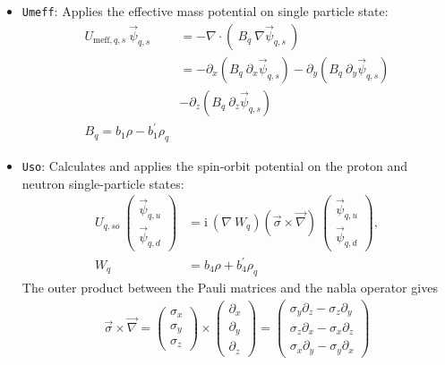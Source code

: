 \documentclass[3p]{elsarticle}
\begin{document}
\begin{itemize}
\item \texttt{Umeff}: Applies the effective mass potential on single particle state: 
\begin{align}
U_{\mathrm{meff},q,s}   \: \vec{\psi}_{q,s}  & = - \nabla \cdot \left( \: B_q \: \nabla \vec{\psi}_{q,s} \: \right) \\
& = - \partial_x \left( B_q \: \partial_x \vec{\psi}_{q,s} \right) - \partial_y \left( B_q \: \partial_y \vec{\psi}_{q,s} \right) \nonumber\\
&- \partial_z \left( B_q \: \partial_z \vec{\psi}_{q,s} \right) \\
B_q = b_1 \rho - b_1^\prime \rho_q 
\label{Umeff_u}
\end{align}
\item \texttt{Uso}: Calculates and applies the spin-orbit potential on the proton and neutron single-particle states:
\begin{align}
U_{q,so} \: \begin{pmatrix} \vec{\psi}_{q,u} \\ \vec{\psi}_{q,d} \end{pmatrix} &= \mathrm{i} \: \left( \nabla \: W_q \right)  ( \vec{\sigma} \times \vec{\nabla} ) \: \begin{pmatrix} \vec{\psi}_{q,u} \\ \vec{\psi}_{q,d} \end{pmatrix}, \\
 W_q &= b_4 \rho + b_4^\prime \rho_q  
\end{align}
The outer product between the Pauli matrices and the nabla operator gives 
\begin{align}
 \vec{\sigma} \times  \vec{\nabla}  =  \begin{pmatrix} \sigma_x \\ \sigma_y \\ \sigma_z \end{pmatrix} \times \begin{pmatrix} \partial_x \\ \partial_y \\ \partial_z \end{pmatrix} = \begin{pmatrix} \sigma_y \partial_z -\sigma_z \partial_y \\ \sigma_z \partial_x - \sigma_x \partial_z \\ \sigma_x \partial_y - \sigma_y \partial_x \end{pmatrix} 
\end{align}

\end{itemize}
\end{document}
